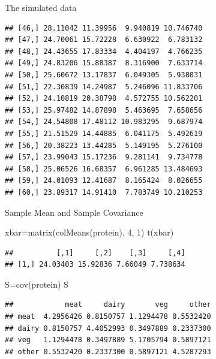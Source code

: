 \documentclass[
  ignorenonframetext,
]{beamer}
\newenvironment{Shaded}{\begin{snugshade}}{\end{snugshade}}
\newcommand{\DecValTok}[1]{\textcolor[rgb]{0.00,0.00,0.81}{#1}}
\newcommand{\FunctionTok}[1]{\textcolor[rgb]{0.00,0.00,0.00}{#1}}
\newcommand{\NormalTok}[1]{#1}
\newcommand{\OtherTok}[1]{\textcolor[rgb]{0.56,0.35,0.01}{#1}}
\begin{document}
\begin{frame}[fragile]{The simulated data}
\begin{verbatim}
## [46,] 28.11042 11.39956  9.940819 10.746740
## [47,] 24.70061 15.72228  6.630922  6.783132
## [48,] 24.43655 17.83334  4.404197  4.766235
## [49,] 24.83206 15.88387  8.316900  7.633714
## [50,] 25.60672 13.17837  6.049305  5.938031
## [51,] 22.30839 14.24987  5.246096 11.833706
## [52,] 24.10819 20.38798  4.572755 10.562201
## [53,] 25.97482 14.87898  5.463695  7.658656
## [54,] 24.54808 17.48112 10.983295  9.687974
## [55,] 21.51529 14.44885  6.041175  5.492619
## [56,] 20.38223 13.44285  5.149195  5.276100
## [57,] 23.99043 15.17236  9.281141  9.734778
## [58,] 25.06526 16.68357  6.961285 13.484693
## [59,] 24.01093 12.41687  8.165424  8.026655
## [60,] 23.89317 14.91410  7.783749 10.210253
\end{verbatim}
\end{frame}

\begin{frame}[fragile]{Sample Mean and Sample Covariance}
\protect\hypertarget{sample-mean-and-sample-covariance}{}
\begin{Shaded}
\begin{Highlighting}[]
\NormalTok{xbar}\OtherTok{=}\FunctionTok{matrix}\NormalTok{(}\FunctionTok{colMeans}\NormalTok{(protein), }\DecValTok{4}\NormalTok{, }\DecValTok{1}\NormalTok{)}
\FunctionTok{t}\NormalTok{(xbar)}
\end{Highlighting}
\end{Shaded}

\begin{verbatim}
##          [,1]     [,2]    [,3]     [,4]
## [1,] 24.03403 15.92836 7.66049 7.738634
\end{verbatim}

\begin{Shaded}
\begin{Highlighting}[]
\NormalTok{S}\OtherTok{=}\FunctionTok{cov}\NormalTok{(protein)}
\NormalTok{S}
\end{Highlighting}
\end{Shaded}

\begin{verbatim}
##            meat     dairy       veg     other
## meat  4.2956426 0.8150757 1.1294478 0.5532420
## dairy 0.8150757 4.4052993 0.3497889 0.2337300
## veg   1.1294478 0.3497889 5.1705794 0.5897121
## other 0.5532420 0.2337300 0.5897121 4.5287293
\end{verbatim}
\end{frame}
\end{document}
